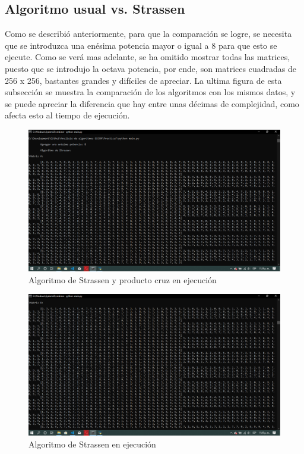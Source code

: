 \documentclass[12pt,twoside]{article}
\begin{document}
\subsection{Algoritmo usual vs. Strassen}
Como se describió anteriormente, para que la comparación se logre, se necesita que se introduzca una en\'esima potencia mayor o igual a 8 para que esto se ejecute.
\newline \newline
Como se ver\'a mas adelante, se ha omitido mostrar todas las matrices, puesto que se introdujo la octava potencia, por ende, son matrices cuadradas de 256 x 256, bastantes grandes y dif\'iciles de apreciar.
\newline \newline
La ultima figura de esta subsecci\'on se muestra la comparaci\'on de los algoritmos con los mismos datos, y se puede apreciar la diferencia que hay entre unas d\'ecimas de complejidad, como afecta esto al tiempo de ejecuci\'on.
\begin{figure}[H]
    \centering
    \includegraphics[scale=0.35]{vs1.png}
    \caption{Algoritmo de Strassen y producto cruz en ejecuci\'on}
    \label{fig:strassen_exec}
\end{figure}
\begin{figure}[H]
    \centering
    \includegraphics[scale=0.35]{vs2.png}
    \caption{Algoritmo de Strassen en ejecuci\'on}
    \label{fig:strassen_exec}
\end{figure}
\end{document}
